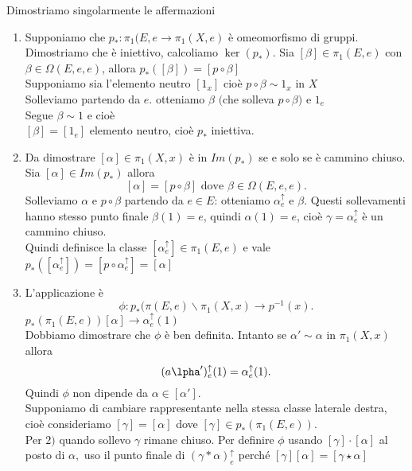 \documentclass[12px]{article}
\begin{document}
\begin{dimo}
	Dimostriamo singolarmente le affermazioni
	\begin{enumerate}
		\item Supponiamo che  $p_*:\pi_1(E,e \rightarrow\pi_1(X,e)$ è omeomorfismo di gruppi. Dimostriamo che è iniettivo, calcoliamo $\ker(p_*)$. Sia $[\beta]\in \pi_1(E,e)$ con $\beta\in\Omega(E,e,e)$, allora $p_*([\beta]) = [p\circ \beta]$\\
			Supponiamo sia l'elemento neutro $[1_x]$ cioè  $p\circ \beta\sim 1_x$ in  $X$\\
			Solleviamo partendo da  $e.$ otteniamo  $\beta$ $($che solleva  $p\circ \beta)$ e  $1_e$ \\
			Segue $\beta\sim 1$ e cioè\\
			$[\beta] = [1_e]$ elemento neutro, cioè  $p_*$ iniettiva.
		\item Da dimostrare $[\alpha]\in\pi_1(X,x)$ è in $Im(p_*)$ se e solo se è cammino chiuso.\\
			Sia  $[\alpha]\in Im(p_*)$ allora 
			 \[
				 [\alpha] = [p\circ\beta] \text{  dove  } \beta\in\Omega(E,e,e)
			.\] 
			Solleviamo $\alpha $ e  $p\circ\beta$ partendo da  $e\in E$: otteniamo  $\alpha^\uparrow_e$ e  $\beta$. Questi sollevamenti hanno stesso punto finale   $\beta(1) = e$, quindi  $\alpha(1) = e$, cioè  $\gamma = \alpha^\uparrow_e$ è un cammino chiuso.\\
			Quindi definisce la classe  $[\alpha^\uparrow_e]\in \pi_1(E,e)$ e vale\\
			$p_*([\alpha^\uparrow_e]) = [p\circ\alpha^\uparrow_e] = [\alpha]$
		\item L'applicazione è 
			\[
				\phi :	p_*(\pi(E,e)\backslash \pi_1(X,x) \rightarrow p^{-1}(x)
			.\] 
			$p_*(\pi_1(E,e))[\alpha] \rightarrow\alpha^\uparrow_e(1)$\\
			Dobbiamo dimostrare che $\phi$ è ben definita. Intanto se $\alpha'\sim \alpha$ in  $\pi_1(X,x)$ allora
			\[
				(a\lpha')^\uparrow_e(1) = \alpha_e^\uparrow (1)
			.\] 
			Quindi $\phi$ non dipende da $\alpha\in[\alpha']$.\\
			Supponiamo di cambiare rappresentante nella stessa classe laterale destra, cioè consideriamo  $[\gamma] = [\alpha]$ dove  $[\gamma]\in p_*(\pi_1(E,e))$.\\
			Per $2)$ quando sollevo $\gamma$ rimane chiuso. Per definire $\phi$ usando  $[\gamma]\cdot[\alpha]$ al posto di  $\alpha,$ uso il punto finale di  $(\gamma *\alpha)^\uparrow_e$ perché  $[\gamma][\alpha] = [\gamma\star\alpha]$\\

\end{enumerate}
\end{dimo}
\end{document}
